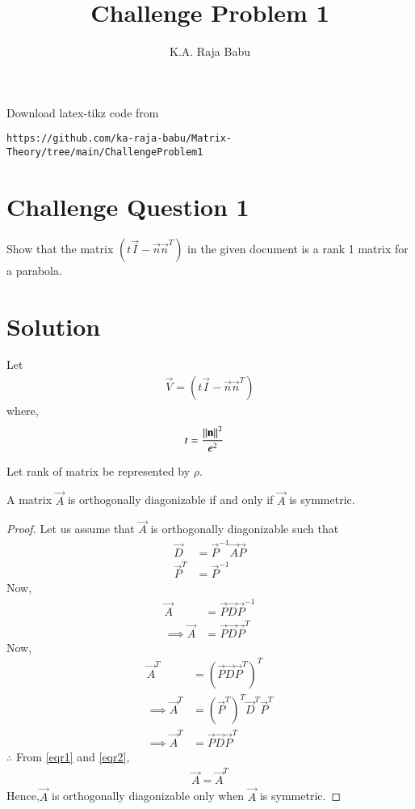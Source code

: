 \documentclass[journal,12pt,twocolumn]{IEEEtran}
\begin{document}
     \def\rightbox#1{\makebox[0in][r]{#1}}
     \def\centbox#1{\makebox[0in]{#1}}
     \def\topbox#1{\raisebox{-\baselineskip}[0in][0in]{#1}}
     \def\midbox#1{\raisebox{-0.5\baselineskip}[0in][0in]{#1}}
\vspace{3cm}
\title{Challenge Problem 1}
\author{K.A. Raja Babu}
\maketitle
\newpage
\bigskip
\renewcommand{\thefigure}{\theenumi}
\renewcommand{\thetable}{\theenumi}
Download latex-tikz code from 
%
\begin{lstlisting}
https://github.com/ka-raja-babu/Matrix-Theory/tree/main/ChallengeProblem1
\end{lstlisting}
%
\section{Challenge Question 1}
Show that the matrix $(t\vec{I}-\vec{n}\vec{n}^T)$ in the given document is a rank 1 matrix for a parabola.
%
\section{Solution}
Let
\begin{align}
    \vec{V} = (t\vec{I}-\vec{n}\vec{n}^T) 
\end{align}
where,
\begin{align}
    t &= \frac{\left\lVert\mathbf{n}\right\rVert^2}{e^2}
\end{align}

Let rank of matrix be represented by $\rho$.

\begin{theorem}
\label{theorem1}
A matrix $\vec{A}$ is orthogonally diagonizable if and only if $\vec{A}$ is symmetric.
\end{theorem}

\begin{proof}
Let us assume that $\vec{A}$ is orthogonally diagonizable such that 
\begin{align}
    \vec{D} &= \vec{P}^{-1}\vec{A}\vec{P}
    \\
    \vec{P}^T &= \vec{P}^{-1}
\end{align}
Now,
\begin{align}
    \vec{A} &= \vec{P}\vec{D}\vec{P}^{-1}
    \\
    \implies \vec{A} &= \vec{P}\vec{D}\vec{P}^T \label{eqr1}
\end{align}
Now,
\begin{align}
    \vec{A}^T &= (\vec{P}\vec{D}\vec{P}^T)^T
    \\
    \implies \vec{A}^T &= (\vec{P}^T)^T\vec{D}^T\vec{P}^T
    \\
    \implies \vec{A}^T &= \vec{P}\vec{D}\vec{P}^T \label{eqr2}
\end{align}
$\therefore$ From \eqref{eqr1} and \eqref{eqr2},
\begin{align}
    \vec{A} = \vec{A}^T
\end{align}
Hence,$\vec{A}$ is orthogonally diagonizable only when $\vec{A}$ is symmetric.
\end{proof}
\end{document}
